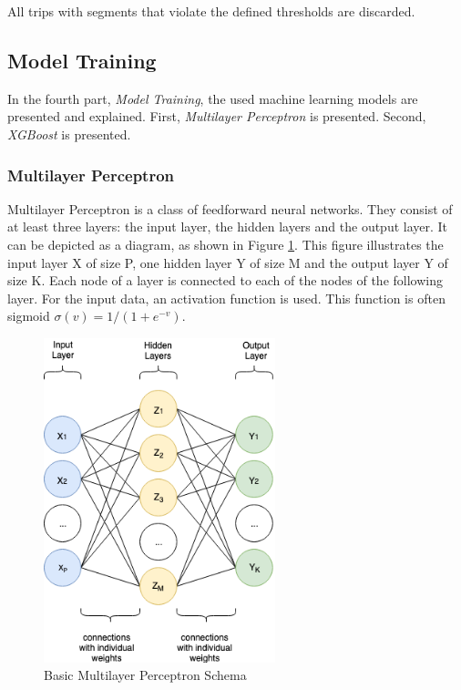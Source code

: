 All trips with segments that violate the defined thresholds are discarded.

\subsection{Model Training}
In the fourth part, \textit{Model Training}, the used machine learning models are presented and explained. First, \textit{Multilayer Perceptron} is presented. Second, \textit{XGBoost} is presented. 

\subsubsection{Multilayer Perceptron}
Multilayer Perceptron is a class of feedforward neural networks. They consist of at least three layers: the input layer, the hidden layers and the output layer. It can be depicted as a diagram, as shown in Figure \ref{fig:mlp-struc}. This figure illustrates the input layer X of size P, one hidden layer Y of size M and the output layer Y of size K. Each node of a layer is connected to each of the nodes of the following layer. For the input data, an activation function is used. This function is often sigmoid $\sigma(v) = 1/(1+e^{-v})$. \cite{hastie2005elements}

\begin{figure}[h]
    \centering
    \includegraphics[width=0.6\textwidth]{images/nn_struct.png}
    \caption{Basic Multilayer Perceptron Schema}
    \label{fig:mlp-struc}
\end{figure}

